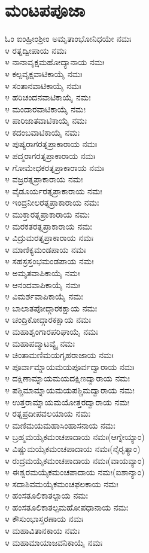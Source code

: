 \section{ಮಂಟಪಪೂಜಾ}
ಓಂ ಐಂಹ್ರೀಂಶ್ರೀಂ ಅಮೃತಾಂಭೋನಿಧಯೇ ನಮಃ\\
೪ ರತ್ನದ್ವೀಪಾಯ ನಮಃ\\
೪ ನಾನಾವೃಕ್ಷಮಹೋದ್ಯಾನಾಯ ನಮಃ\\
೪ ಕಲ್ಪವೃಕ್ಷವಾಟಿಕಾಯೈ ನಮಃ\\
೪ ಸಂತಾನವಾಟಿಕಾಯೈ ನಮಃ\\
೪ ಹರಿಚಂದನವಾಟಿಕಾಯೈ ನಮಃ\\
೪ ಮಂದಾರವಾಟಿಕಾಯೈ ನಮಃ\\
೪ ಪಾರಿಜಾತವಾಟಿಕಾಯೈ ನಮಃ\\
೪ ಕದಂಬವಾಟಿಕಾಯೈ ನಮಃ\\
೪ ಪುಷ್ಯರಾಗರತ್ನಪ್ರಾಕಾರಾಯ ನಮಃ\\
೪ ಪದ್ಮರಾಗರತ್ನಪ್ರಾಕಾರಾಯ ನಮಃ\\
೪ ಗೋಮೇಧಕರತ್ನಪ್ರಾಕಾರಾಯ ನಮಃ\\
೪ ವಜ್ರರತ್ನಪ್ರಾಕಾರಾಯ ನಮಃ\\
೪ ವೈಡೂರ್ಯರತ್ನಪ್ರಾಕಾರಾಯ ನಮಃ\\
೪ ಇಂದ್ರನೀಲರತ್ನಪ್ರಾಕಾರಾಯ ನಮಃ\\
೪ ಮುಕ್ತಾರತ್ನಪ್ರಾಕಾರಾಯ ನಮಃ\\
೪ ಮರಕತರತ್ನಪ್ರಾಕಾರಾಯ ನಮಃ\\
೪ ವಿದ್ರುಮರತ್ನಪ್ರಾಕಾರಾಯ ನಮಃ\\
೪ ಮಾಣಿಕ್ಯಮಂಡಪಾಯ ನಮಃ\\
೪ ಸಹಸ್ರಸ್ತಂಭಮಂಡಪಾಯ ನಮಃ\\
೪ ಅಮೃತವಾಪಿಕಾಯೈ ನಮಃ\\
೪ ಆನಂದವಾಪಿಕಾಯೈ ನಮಃ\\
೪ ವಿಮರ್ಶವಾಪಿಕಾಯೈ ನಮಃ\\
೪ ಬಾಲಾತಪೋದ್ಗಾರಕಕ್ಷಾಯ ನಮಃ\\
೪ ಚಂದ್ರಿಕೋದ್ಗಾರಕಕ್ಷಾಯ ನಮಃ\\
೪ ಮಹಾಶೃಂಗಾರಪರಿಘಾಯೈ ನಮಃ\\
೪ ಮಹಾಪದ್ಮಾಟವ್ಯೈ ನಮಃ\\
೪ ಚಿಂತಾಮಣಿಮಯಗೃಹರಾಜಾಯ ನಮಃ\\
೪ ಪೂರ್ವಾಮ್ನಾಯಮಯಪೂರ್ವದ್ವಾರಾಯ ನಮಃ\\
೪ ದಕ್ಷಿಣಾಮ್ನಾಯಮಯದಕ್ಷಿಣದ್ವಾರಾಯ ನಮಃ\\
೪ ಪಶ್ಚಿಮಾಮ್ನಾಯಮಯಪಶ್ಚಿಮದ್ವಾರಾಯ ನಮಃ\\
೪ ಉತ್ತರಾಮ್ನಾಯಮಯೋತ್ತರದ್ವಾರಾಯ ನಮಃ\\
೪ ರತ್ನಪ್ರದೀಪವಲಯಾಯ ನಮಃ\\
೪ ಮಣಿಮಯಮಹಾಸಿಂಹಾಸನಾಯ ನಮಃ\\
೪ ಬ್ರಹ್ಮಮಯೈಕಮಂಚಪಾದಾಯ ನಮಃ(ಆಗ್ನೇಯ್ಯಾಂ)\\
೪ ವಿಷ್ಣುಮಯೈಕಮಂಚಪಾದಾಯ ನಮಃ(ನೈರೃತ್ಯಾಂ)\\
೪ ರುದ್ರಮಯೈಕಮಂಚಪಾದಾಯ ನಮಃ(ವಾಯವ್ಯಾಂ)\\
೪ ಈಶ್ವರಮಯೈಕಮಂಚಪಾದಾಯ ನಮಃ(ಐಶಾನ್ಯಾಂ)\\
೪ ಸದಾಶಿವಮಯೈಕಮಂಚಫಲಕಾಯ ನಮಃ\\
೪ ಹಂಸತೂಲಿಕಾತಲ್ಪಾಯ ನಮಃ\\
೪ ಹಂಸತೂಲಿಕಾತಲ್ಪಮಹೋಪಧಾನಾಯ ನಮಃ\\
೪ ಕೌಸುಂಭಾಸ್ತರಣಾಯ ನಮಃ\\
೪ ಮಹಾವಿತಾನಕಾಯ ನಮಃ\\
೪ ಮಹಾಮಾಯಾಜವನಿಕಾಯೈ ನಮಃ

